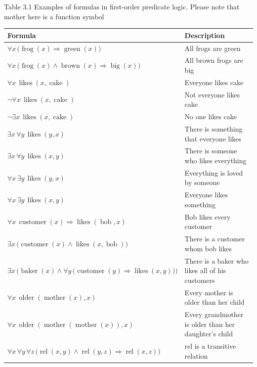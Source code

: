 \documentclass[10pt]{book}
\begin{document}
Table 3.1 Examples of formulas in first-order predicate logic. Please note that mother here is a function symbol
\begin{center}
\begin{tabular}{|l|l|}
\hline
Formula & Description \\
\hline
$\forall x\, \bigl(\operatorname{frog}(x) \Rightarrow \operatorname{green}(x)\bigr)$ & All frogs are green \\
\hline
$\forall x\, \bigl(\operatorname{frog}(x) \wedge \operatorname{brown}(x) \Rightarrow \operatorname{big}(x)\bigr)$ & All brown frogs are big \\
\hline
$\forall x\, \operatorname{likes}(x,\operatorname{cake})$ & Everyone likes cake \\
\hline
$\neg \forall x\, \operatorname{likes}(x,\operatorname{cake})$ & Not everyone likes cake \\
\hline
$\neg \exists x\, \operatorname{likes}(x,\operatorname{cake})$ & No one likes cake \\
\hline
$\exists x\, \forall y\, \operatorname{likes}(y,x)$ & There is something that everyone likes \\
\hline
$\exists x\, \forall y\, \operatorname{likes}(x,y)$ & There is someone who likes everything \\
\hline
$\forall x\, \exists y\, \operatorname{likes}(y,x)$ & Everything is loved by someone \\
\hline
$\forall x\, \exists y\, \operatorname{likes}(x,y)$ & Everyone likes something \\
\hline
$\forall x\, \operatorname{customer}(x) \Rightarrow \operatorname{likes}(\operatorname{bob},x)$ & Bob likes every customer \\
\hline
$\exists x\, \bigl(\operatorname{customer}(x) \wedge \operatorname{likes}(x,\operatorname{bob})\bigr)$ & There is a customer whom bob likes \\
\hline
$\exists x\, \bigl(\operatorname{baker}(x) \wedge \forall y\, \bigl(\operatorname{customer}(y) \Rightarrow \operatorname{likes}(x,y)\bigr)\bigr)$ & There is a baker who likes all of his customers \\
\hline
$\forall x\, \operatorname{older}(\operatorname{mother}(x),x)$ & Every mother is older than her child \\
\hline
$\forall x\, \operatorname{older}(\operatorname{mother}(\operatorname{mother}(x)),x)$ & Every grandmother is older than her daughter's child \\
\hline
$\forall x\, \forall y\, \forall z\, \bigl(\operatorname{rel}(x,y) \wedge \operatorname{rel}(y,z) \Rightarrow \operatorname{rel}(x,z)\bigr)$ & rel is a transitive relation \\
\hline
\end{tabular}
\end{center}
\end{document}
